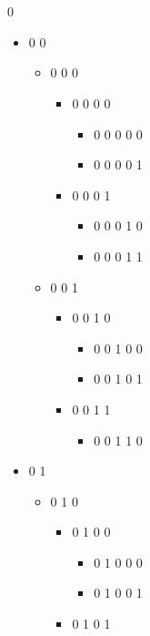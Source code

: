 \\
\\0 
\begin{itemize}
\item 0 0 


\begin{itemize}
\item 0 0 0 

\begin{itemize}
\item 0 0 0 0 

\begin{itemize}
\item 0 0 0 0 0 
\item 0 0 0 0 1
\end{itemize}
\item 0 0 0 1 


\begin{itemize}
\item 0 0 0 1 0 
\item 0 0 0 1 1
\end{itemize}
\end{itemize}
\item 0 0 1 


\begin{itemize}
\item 0 0 1 0 


\begin{itemize}
\item 0 0 1 0 0 
\item 0 0 1 0 1
\end{itemize}
\item 0 0 1 1 


\begin{itemize}
\item 0 0 1 1 0
\end{itemize}
\end{itemize}
\end{itemize}
\item 0 1 


\begin{itemize}
\item 0 1 0 


\begin{itemize}
\item 0 1 0 0 


\begin{itemize}
\item 0 1 0 0 0 
\item 0 1 0 0 1
\end{itemize}
\item 0 1 0 1 



\end{itemize}
\end{itemize}
\end{itemize}
